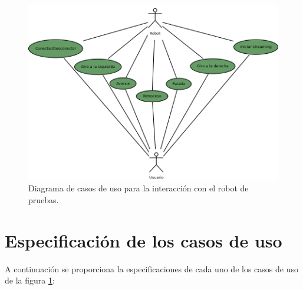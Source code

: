 \begin{figure}[H]
  \begin{center}
    \includegraphics[scale=.5]{diagramas/casos-uso-robot.png}
  \end{center}
  \caption{Diagrama de casos de uso para la interacción con el robot de pruebas.}
  \label{diagram:caso-uso}
\end{figure}


\section{Especificación de los casos de uso}
\label{sec:especificaciones-caso-uso}


A continuación se proporciona la especificaciones de cada uno de los casos de uso de la figura \ref{diagram:caso-uso}:


